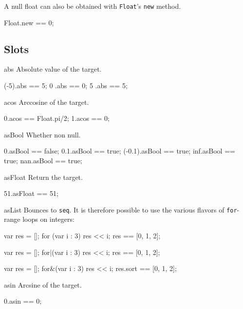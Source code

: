 A null float can also be obtained with \lstinline|Float|'s
\lstinline|new| method.

\begin{urbiassert}
Float.new == 0;
\end{urbiassert}

\subsection{Slots}

\begin{urbiscriptapi}
\item[abs]
  Absolute value of the target.
\begin{urbiassert}
(-5).abs == 5;
  0 .abs == 0;
  5 .abs == 5;
\end{urbiassert}

\item[acos]
  Arccosine of the target.
\begin{urbiassert}
0.acos == Float.pi/2;
1.acos == 0;
\end{urbiassert}

\item[asBool]
  Whether non null.
\begin{urbiassert}
0.asBool == false;
0.1.asBool == true;
(-0.1).asBool == true;
inf.asBool == true;
nan.asBool == true;
\end{urbiassert}

\item[asFloat]
  Return the target.
\begin{urbiassert}
51.asFloat == 51;
\end{urbiassert}

\item[asList]
  Bounces to \lstinline|seq|.  It is therefore possible to use the
  various flavors of \lstinline|for|-range loops on integers:
\begin{urbiassert}
{
  var res = [];
  for (var i : 3)
    res << i;
  res
}
== [0, 1, 2];

{
  var res = [];
  for|(var i : 3)
    res << i;
  res
}
== [0, 1, 2];

{
  var res = [];
  for&(var i : 3)
    res << i;
  res.sort
}
== [0, 1, 2];
\end{urbiassert}%

\item[asin]
  Arcsine of the target.
\begin{urbiassert}
0.asin == 0;
\end{urbiassert}


\end{urbiscriptapi}
